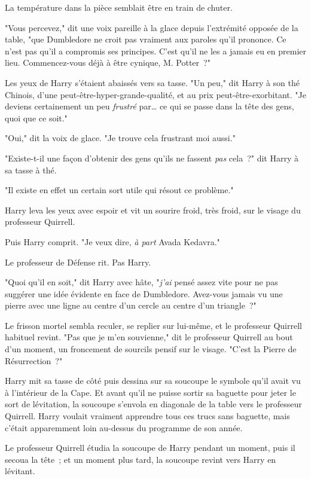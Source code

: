 La température dans la pièce semblait être en train de chuter.

"Vous percevez," dit une voix pareille à la glace depuis l'extrémité opposée de la table, "que Dumbledore ne croit pas vraiment aux paroles qu'il prononce. Ce n'est pas qu'il a compromis ses principes. C'est qu'il ne les a jamais eu en premier lieu. Commencez-vous déjà à être cynique, M. Potter~?"

Les yeux de Harry s'étaient abaissés vers sa tasse. "Un peu," dit Harry à son thé Chinois, d'une peut-être-hyper-grande-qualité, et au prix peut-être-exorbitant. "Je deviens certainement un peu \emph{frustré} par… ce qui se passe dans la tête des gens, quoi que ce soit."

"Oui," dit la voix de glace. "Je trouve cela frustrant moi aussi."

"Existe-t-il une façon d'obtenir des gens qu'ils ne fassent \emph{pas} cela~?" dit Harry à sa tasse à thé.

"Il existe en effet un certain sort utile qui résout ce problème."

Harry leva les yeux avec espoir et vit un sourire froid, très froid, sur le visage du professeur Quirrell.

Puis Harry comprit. "Je veux dire, \emph{à part} Avada Kedavra."

Le professeur de Défense rit. Pas Harry.

"Quoi qu'il en soit," dit Harry avec hâte, "\emph{j'ai} pensé assez vite pour ne pas suggérer une idée évidente en face de Dumbledore. Avez-vous jamais vu une pierre avec une ligne au centre d'un cercle au centre d'un triangle~?"

Le frisson mortel sembla reculer, se replier sur lui-même, et le professeur Quirrell habituel revint. "Pas que je m'en souvienne," dit le professeur Quirrell au bout d'un moment, un froncement de sourcils pensif sur le visage. "C'est la Pierre de Résurrection~?"

Harry mit sa tasse de côté puis dessina sur sa soucoupe le symbole qu'il avait vu à l'intérieur de la Cape. Et avant qu'il ne puisse sortir sa baguette pour jeter le sort de lévitation, la soucoupe s'envola en diagonale de la table vers le professeur Quirrell. Harry voulait vraiment apprendre tous ces trucs sans baguette, mais c'était apparemment loin au-dessus du programme de son année.

Le professeur Quirrell étudia la soucoupe de Harry pendant un moment, puis il secoua la tête~; et un moment plus tard, la soucoupe revint vers Harry en lévitant.

